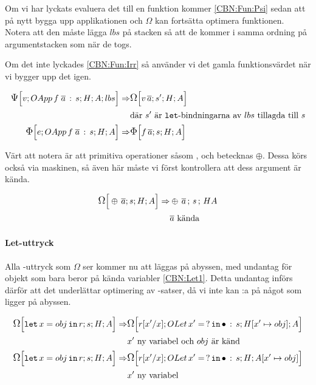 \documentclass[../Optimise]{subfiles}
\begin{document}
Om vi har lyckats evaluera det till en funktion kommer \eqref{CBN:Fun:Psi} sedan att
på nytt bygga upp applikationen och $\Omega$ kan fortsätta optimera funktionen.
Notera att den måste lägga $lbs$ på stacken så att de kommer i samma ordning på 
argumentstacken som när de togs.

Om det inte lyckades \eqref{CBN:Fun:Irr} så använder vi det gamla funktionsvärdet
när vi bygger upp det igen.

\begin{align}
\label{CBN:Fun:Psi}\CBNPSI{\cOApp f{\many{a}}s}HA{lbs}v  \Rightarrow & \CBNOMEGA {s'}HA{v\, \many{a}} \\
 & \text{där } s' \text{ är \kw{let}-bindningarna av } lbs \text{ tillagda till } s \nonumber \\
\label{CBN:Fun:Irr}\CBNIRR {\cOApp f {\many{a}}s}HAe  \Rightarrow & \CBNIRR sHA{f\, \many{a}}
\end{align}

Värt att notera är att primitiva operationer såsom \ic{+\#}, \ic{*\#} och \ic{==\#} betecknas $\oplus$. 
Dessa körs också via maskinen, så även här måste vi först kontrollera att dess argument
är kända.

\begin{align}
\CBNOMEGA sHA{\oplus\, \many{a}}  \Rightarrow & \mc{\oplus\, \many{a}}sHA \\
 & \many{a} \text{ kända } \nonumber
\end{align}


\paragraph{Let-uttryck}
Alla -uttryck som $\Omega$ ser kommer nu att läggas på abyssen, 
med undantag för objekt som bara beror på kända variabler \eqref{CBN:Let1}. 
Detta undantag införs därför att det underlättar optimering av -satser, 
då vi inte kan :a på något som ligger på abyssen.

\begin{align}
\label{CBN:Let1} \CBNOMEGA sHA{\eLet x{obj}r} \Rightarrow & \CBNOMEGA {\cOLet{x'}s}{\heap{x'}{obj}}A{\subst r{x'}x}\\
   & x'\mbox{ ny variabel och } obj \text{ är känd}\nonumber \\
\label{CBN:Let2} \CBNOMEGA sHA{\eLet x{obj}r} \Rightarrow & \CBNOMEGA{\cOLet{x'}s}H{\abyss{x'}{obj}}{\subst r{x'}x}\\
   & x'\mbox{ ny variabel} \nonumber 
\end{align}
\end{document}
